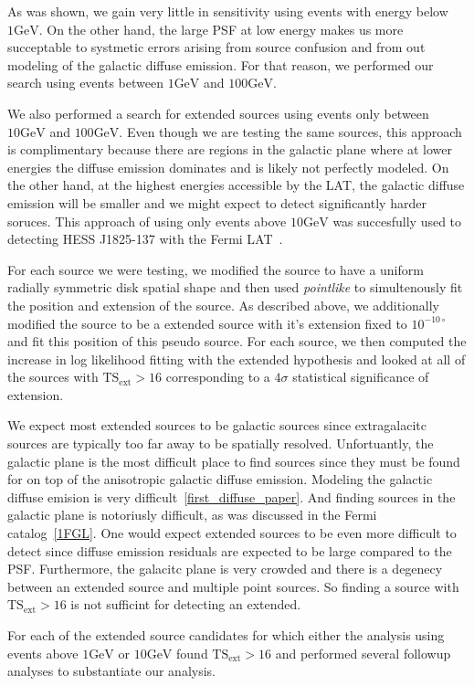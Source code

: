 \documentclass[preprint]{aastex}
\newcommand{\gev}{\text{GeV}\xspace}
\newcommand{\tsext}{\ensuremath{\text{TS}_\text{ext}}\xspace}
\newcommand{\pointlike}{{\em pointlike}\xspace}
\begin{document}
As was shown, we gain very little in sensitivity using events with energy
below $1\gev$. On the other hand, the large PSF at low energy makes us
more succeptable to systmetic errors arising from source confusion and
from out modeling of the galactic diffuse emission.  For that reason,
we performed our search using events between $1\gev$ and $100\gev$.

We also performed a search for extended sources using events only between
$10\gev$ and $100\gev$. Even though we are testing the same sources,
this approach is complimentary because there are regions in the galactic
plane where at lower energies the diffuse emission dominates and is
likely not perfectly modeled. On the other hand, at the highest energies
accessible by the LAT, the galactic diffuse emission will be smaller and
we might expect to detect significantly harder soruces. This approach
of using only events above $10\gev$ was succesfully used to detecting
HESS J1825-137 with the Fermi LAT~\cite{HESS J1825 paper}.

For each source we were testing, we modified the source to have a
uniform radially symmetric disk spatial shape and then used \pointlike to
simultenously fit the position and extension of the source. As described
above, we additionally modified the source to be a extended source with
it's extension fixed to $10^{-10\circ}$ and fit this position of this
pseudo source. For each source, we then computed the increase in log
likelihood fitting with the extended hypothesis and looked at all of
the sources with $\tsext>16$ corresponding to a $4\sigma$ statistical
significance of extension.

We expect most extended sources to be galactic sources since
extragalacitc sources are typically too far away to be spatially
resolved. Unfortuantly, the galactic plane is the most difficult place
to find sources since they must be found for on top of the anisotropic
galactic diffuse emission.  Modeling the galactic diffuse emision is
very difficult~\ref{first_diffuse_paper}.  And finding sources in the
galactic plane is notoriusly difficult, as was discussed in the Fermi
catalog~\ref{1FGL}. One would expect extended sources to be even more
difficult to detect since diffuse emission residuals are expected
to be large compared to the PSF. Furthermore, the galacitc plane
is very crowded and there is a degenecy between an extended source
and multiple point sources. So finding a source with
$\tsext>16$ is not sufficint for detecting an extended.

For each of the extended source candidates for which either the analysis
using events above $1\gev$ or $10\gev$ found $\tsext>16$
and performed several followup analyses to substantiate our analysis.
\end{document}

